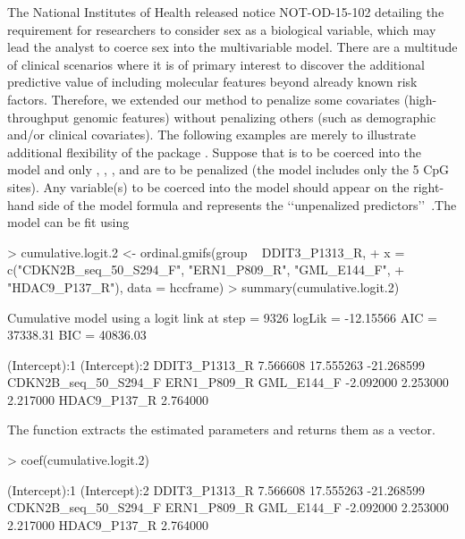 \documentclass[article, shortclass, nojss]{jss}
\begin{document}
The National Institutes of Health released notice NOT-OD-15-102 detailing the requirement for researchers to consider sex as a biological variable, which may lead the analyst to coerce sex into the multivariable model. There are a multitude of clinical scenarios where it is of primary interest to discover the additional predictive value of including molecular features beyond already known risk factors. Therefore, we extended our method to penalize some covariates (high-throughput genomic features) without penalizing others (such as demographic and/or clinical covariates).   The following examples are merely to illustrate additional flexibility of the package \cite{Gentry}. Suppose that  is to be coerced into the model and only , , , and  are to be penalized (the model includes only the 5 CpG sites). Any variable(s) to be coerced into the model should appear on the right-hand side of the model formula and represents the \lq\lq unpenalized predictors\rq\rq\ .The model can be fit using
\begin{Schunk}
\begin{Sinput}
> cumulative.logit.2 <- ordinal.gmifs(group ~ DDIT3_P1313_R, 
+      x = c("CDKN2B_seq_50_S294_F", "ERN1_P809_R", "GML_E144_F",
+      	    "HDAC9_P137_R"),  data = hccframe)
> summary(cumulative.logit.2)
\end{Sinput}
\begin{Soutput}
Cumulative model using a  logit  link 
at step    =  9326 
logLik     =  -12.15566 
AIC        =  37338.31 
BIC        =  40836.03 

       (Intercept):1        (Intercept):2        DDIT3_P1313_R 
            7.566608            17.555263           -21.268599 
CDKN2B_seq_50_S294_F          ERN1_P809_R           GML_E144_F 
           -2.092000             2.253000             2.217000 
        HDAC9_P137_R 
            2.764000 
\end{Soutput}
\end{Schunk}
The  function extracts the estimated parameters and returns them as a vector. 
\begin{Schunk}
\begin{Sinput}
> coef(cumulative.logit.2)
\end{Sinput}
\begin{Soutput}
       (Intercept):1        (Intercept):2        DDIT3_P1313_R 
            7.566608            17.555263           -21.268599 
CDKN2B_seq_50_S294_F          ERN1_P809_R           GML_E144_F 
           -2.092000             2.253000             2.217000 
        HDAC9_P137_R 
            2.764000 
\end{Soutput}
\end{Schunk}
\end{document}
